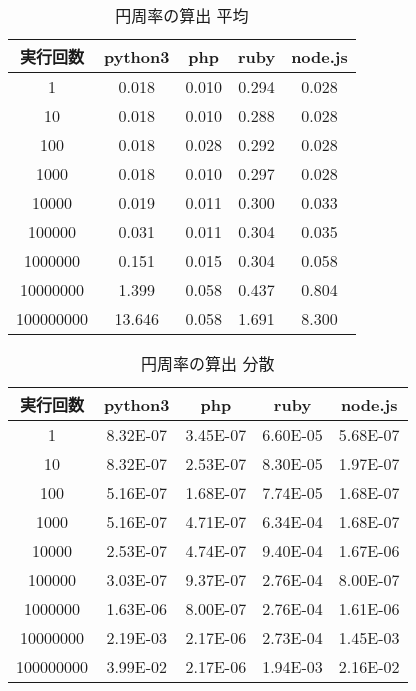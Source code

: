 \begin{table}[tb]
\centering
\begin{tabular}{|c||c|c|c|c|}
\hline
実行回数	&python3	&php	&ruby	&node.js\\ \hline
1	&0.018	&0.010	&0.294	&0.028\\ \hline
10	&0.018	&0.010	&0.288	&0.028\\ \hline
100	&0.018	&0.028	&0.292	&0.028\\ \hline
1000	&0.018	&0.010	&0.297	&0.028\\ \hline
10000	&0.019	&0.011	&0.300	&0.033\\ \hline
100000	&0.031	&0.011	&0.304	&0.035\\ \hline
1000000	&0.151	&0.015	&0.304	&0.058\\ \hline
10000000	&1.399	&0.058	&0.437	&0.804\\ \hline
100000000	&13.646	&0.058	&1.691	&8.300\\ \hline
\end{tabular}
\caption{円周率の算出 平均}
\label{table:p-average}
\end{table}

\begin{table}[tb]
\centering
\begin{tabular}{|c||c|c|c|c|}
\hline
実行回数	&python3	&php	&ruby	&node.js\\ \hline
1		&8.32E-07	&3.45E-07	&6.60E-05	&5.68E-07\\ \hline
10		&8.32E-07	&2.53E-07	&8.30E-05	&1.97E-07\\ \hline
100		&5.16E-07	&1.68E-07	&7.74E-05	&1.68E-07\\ \hline
1000		&5.16E-07	&4.71E-07	&6.34E-04	&1.68E-07\\ \hline
10000		&2.53E-07	&4.74E-07	&9.40E-04	&1.67E-06\\ \hline
100000		&3.03E-07	&9.37E-07	&2.76E-04	&8.00E-07\\ \hline
1000000		&1.63E-06	&8.00E-07	&2.76E-04	&1.61E-06\\ \hline
10000000	&2.19E-03	&2.17E-06	&2.73E-04	&1.45E-03\\ \hline
100000000	&3.99E-02	&2.17E-06	&1.94E-03	&2.16E-02\\ \hline

\end{tabular}
\caption{円周率の算出 分散}
\label{table:p-dispersion}
\end{table}

\clearpage

